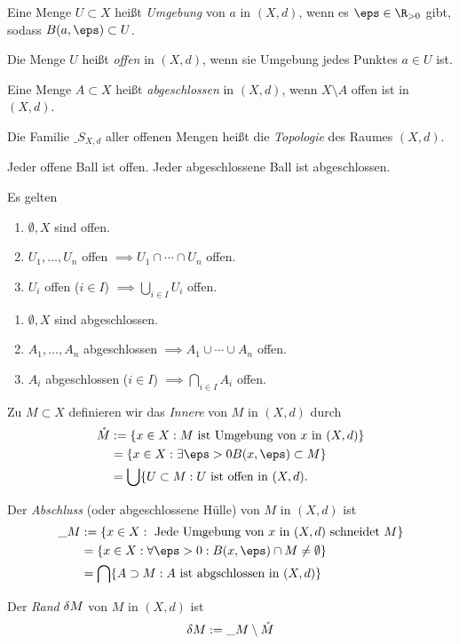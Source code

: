 \begin{df}
	Eine Menge $U \subset X$ heißt \emph{Umgebung} von $a$ in $(X,d)$, wenn es $\eps \in \R_{> 0}$ gibt, sodass $B(a,\eps) \subset U$.

	Die Menge $U$ heißt \emph{offen} in $(X,d)$, wenn sie Umgebung jedes Punktes $a \in U$ ist.

	Eine Menge $A \subset X$ heißt \emph{abgeschlossen} in $(X,d)$, wenn $X \setminus A$ offen ist in $(X,d)$.

	Die Familie $\_{S_{X,d}}$ aller offenen Mengen heißt die \emph{Topologie} des Raumes $(X,d)$.
\end{df}

\begin{prop}
	Jeder offene Ball ist offen.
	Jeder abgeschlossene Ball ist abgeschlossen.

	Es gelten
	\begin{enumerate}[({O}1)]
		\item
			$\emptyset, X$ sind offen.
		\item
			$U_1,\dotsc,U_n$ offen $\implies U_1 \cap \dotsb \cap U_n$ offen.
		\item
			$U_i$ offen ($i\in I$) $\implies \bigcup_{i\in I} U_i$ offen.
	\end{enumerate}
	\begin{enumerate}[({A}1)]
		\item
			$\emptyset, X$ sind abgeschlossen.
		\item
			$A_1,\dotsc,A_n$ abgeschlossen $\implies A_1 \cup \dotsb \cup A_n$ offen.
		\item
			$A_i$ abgeschlossen ($i\in I$) $\implies \bigcap_{i\in I} A_i$ offen.
	\end{enumerate}
\end{prop}

\begin{df}
	Zu $M \subset X$ definieren wir das \emph{Innere} von $M$ in $(X,d)$ durch
	\begin{align*}
		\mathring M &:= \{ x \in X : M \text{ ist Umgebung von $x$ in $(X,d)$} \} \\
		&= \{ x \in X : \exists \eps > 0 B(x,\eps) \subset M \} \\
		&= \bigcup \{ U \subset M : U \text{ ist offen in $(X,d)$}.
	\end{align*}

	Der \emph{Abschluss} (oder abgeschlossene Hülle) von $M$ in $(X,d)$ ist
	\begin{align*}
		\_{M} &:= \{ x \in X : \text{ Jede Umgebung von $x$ in $(X,d)$ schneidet $M$} \} \\
		&= \{ x \in X : \forall \eps > 0 : B(x,\eps) \cap M \neq \emptyset \} \\
		&= \bigcap \{ A \supset M : \text{$A$ ist abgschlossen in $(X,d)$} \}
	\end{align*}

	Der \emph{Rand} $\delta M$ von $M$ in $(X,d)$ ist
	\[
		\delta M := \_{M} \setminus \mathring M
	\]
\end{df}

